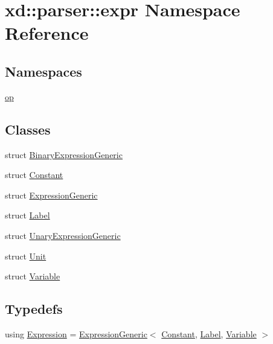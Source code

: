 \hypertarget{namespacexd_1_1parser_1_1expr}{}\section{xd\+:\+:parser\+:\+:expr Namespace Reference}
\label{namespacexd_1_1parser_1_1expr}
\subsection*{Namespaces}
\begin{DoxyCompactItemize}
\item 
 \mbox{\hyperlink{namespacexd_1_1parser_1_1expr_1_1op}{op}}
\end{DoxyCompactItemize}
\subsection*{Classes}
\begin{DoxyCompactItemize}
\item 
struct \mbox{\hyperlink{structxd_1_1parser_1_1expr_1_1_binary_expression_generic}{Binary\+Expression\+Generic}}
\item 
struct \mbox{\hyperlink{structxd_1_1parser_1_1expr_1_1_constant}{Constant}}
\item 
struct \mbox{\hyperlink{structxd_1_1parser_1_1expr_1_1_expression_generic}{Expression\+Generic}}
\item 
struct \mbox{\hyperlink{structxd_1_1parser_1_1expr_1_1_label}{Label}}
\item 
struct \mbox{\hyperlink{structxd_1_1parser_1_1expr_1_1_unary_expression_generic}{Unary\+Expression\+Generic}}
\item 
struct \mbox{\hyperlink{structxd_1_1parser_1_1expr_1_1_unit}{Unit}}
\item 
struct \mbox{\hyperlink{structxd_1_1parser_1_1expr_1_1_variable}{Variable}}
\end{DoxyCompactItemize}
\subsection*{Typedefs}
\begin{DoxyCompactItemize}
\item 
using \mbox{\hyperlink{namespacexd_1_1parser_1_1expr_a5ac81194bba038e6a1c652c9d95288d6}{Expression}} = \mbox{\hyperlink{structxd_1_1parser_1_1expr_1_1_expression_generic}{Expression\+Generic}}$<$ \mbox{\hyperlink{structxd_1_1parser_1_1expr_1_1_constant}{Constant}}, \mbox{\hyperlink{structxd_1_1parser_1_1expr_1_1_label}{Label}}, \mbox{\hyperlink{structxd_1_1parser_1_1expr_1_1_variable}{Variable}} $>$
\end{DoxyCompactItemize}


